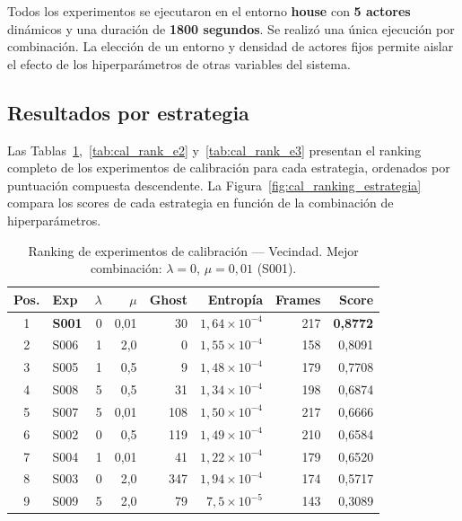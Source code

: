 Todos los experimentos se ejecutaron en el entorno \textbf{house} con \textbf{5 actores} dinámicos y una duración de \textbf{1800 segundos}. Se realizó una única ejecución por combinación. La elección de un entorno y densidad de actores fijos permite aislar el efecto de los hiperparámetros de otras variables del sistema.

\subsection{Resultados por estrategia}

Las Tablas~\ref{tab:cal_rank_e1},~\ref{tab:cal_rank_e2} y~\ref{tab:cal_rank_e3} presentan el ranking completo de los experimentos de calibración para cada estrategia, ordenados por puntuación compuesta descendente. La Figura~\ref{fig:cal_ranking_estrategia} compara los scores de cada estrategia en función de la combinación de hiperparámetros.

\begin{table}[htbp]
    \centering
    \caption{Ranking de experimentos de calibración --- Vecindad. Mejor combinación: $\lambda=0$, $\mu=0{,}01$ (S001).}%
    \label{tab:cal_rank_e1}
    \begin{tabular}{clrrrrrr}
        \toprule
        \textbf{Pos.} & \textbf{Exp} & $\lambda$ & $\mu$ & \textbf{Ghost} & \textbf{Entropía} & \textbf{Frames} & \textbf{Score} \\
        \midrule
        1 & \textbf{S001} & 0 & 0,01 & 30  & $1{,}64\times10^{-4}$ & 217 & \textbf{0,8772} \\
        2 & S006 & 1 & 2,0  &  0  & $1{,}55\times10^{-4}$ & 158 & 0,8091 \\
        3 & S005 & 1 & 0,5  &  9  & $1{,}48\times10^{-4}$ & 179 & 0,7708 \\
        4 & S008 & 5 & 0,5  & 31  & $1{,}34\times10^{-4}$ & 198 & 0,6874 \\
        5 & S007 & 5 & 0,01 & 108 & $1{,}50\times10^{-4}$ & 217 & 0,6666 \\
        6 & S002 & 0 & 0,5  & 119 & $1{,}49\times10^{-4}$ & 210 & 0,6584 \\
        7 & S004 & 1 & 0,01 &  41 & $1{,}22\times10^{-4}$ & 179 & 0,6520 \\
        8 & S003 & 0 & 2,0  & 347 & $1{,}94\times10^{-4}$ & 174 & 0,5717 \\
        9 & S009 & 5 & 2,0  &  79 & $7{,}5\times10^{-5}$  & 143 & 0,3089 \\
        \bottomrule
    \end{tabular}
\end{table}

